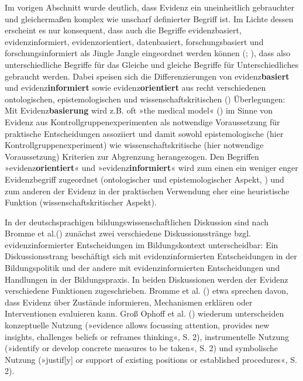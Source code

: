 \documentclass[
  man,
  floatsintext,
  longtable,
  nolmodern,
  notxfonts,
  notimes,
  colorlinks=true,linkcolor=blue,citecolor=blue,urlcolor=blue]{apa7}
\begin{document}
Im vorigen Abschnitt wurde deutlich, dass Evidenz ein uneinheitlich
gebrauchter und gleichermaßen komplex wie unscharf definierter Begriff
ist. Im Lichte dessen erscheint es nur konsequent, dass auch die
Begriffe evidenzbasiert, evidenzinformiert, evidenzorientiert,
datenbasiert, forschungsbasiert und forschungsinformiert als Jingle
Jangle eingeordnet werden können (; ), dass also
unterschiedliche Begriffe für das Gleiche und gleiche Begriffe für
Unterschiedliches gebraucht werden. Dabei speisen sich die
Differenzierungen von evidenz\textbf{basiert} und
evidenz\textbf{informiert} sowie evidenz\textbf{orientiert} aus recht
verschiedenen ontologischen, epistemologischen und
wissenschaftskritischen () Überlegungen: Mit Evidenz\textbf{basierung} wird z.B. oft »the
medical model« () im Sinne von
Evidenz aus Kontrollgruppenexperimenten als notwendige Voraussetzung für
praktische Entscheidungen assoziiert und damit sowohl epistemologische
(hier Kontrollgruppenexperiment) wie wissenschaftskritische (hier
notwendige Voraussetzung) Kriterien zur Abgrenzung herangezogen. Den
Begriffen »evidenz\textbf{orientiert}« und »evidenz\textbf{informiert}«
wird zum einen ein weniger enger Evidenzbegriff zugeordnet
(ontologischer und epistemologischer Aspekt,
) und zum anderen der Evidenz in
der praktischen Verwendung eher eine heuristische Funktion
(wissenschaftskritischer Aspekt).

In der deutschsprachigen bildungswissenschaftlichen Diskussion sind nach
Bromme et al.() zunächst zwei
verschiedene Diskussionsstränge bzgl. evidenzinformierter Entscheidungen
im Bildungskontext unterscheidbar: Ein Diskussionsstrang beschäftigt
sich mit evidenzinformierten Entscheidungen in der Bildungspolitik und
der andere mit evidenzinformierten Entscheidungen und Handlungen in der
Bildungspraxis. In beiden Diskussionen werden der Evidenz verschiedene
Funktionen zugeschrieben. Bromme et al.
() etwa sprechen davon, dass Evidenz
über Zustände informieren, Mechanismen erklären oder Interventionen
evaluieren kann. Groß Ophoff et al.
() wiederum unterscheiden
konzeptuelle Nutzung (»evidence allows focussing attention, provides new
insights, challenges beliefs or reframes thinking«, S. 2),
instrumentelle Nutzung (»identify or develop concrete measures to be
taken«, S. 2) und symbolische Nutzung (»justif{[}y{]} or support of
existing positions or established procedures«, S. 2).
\end{document}
